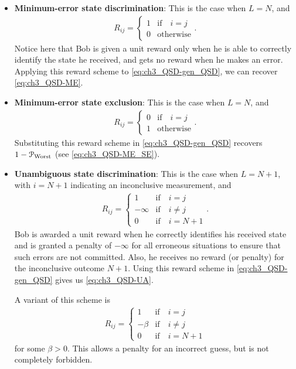 \begin{itemize} 
\item \textbf{Minimum-error state discrimination}: This is the case when $L = N$, and
\begin{align}
    \label{eq:ch3_QSD-R_ME_SD}
    R_{ij} =
    \begin{cases}
        1 &\text{if} \quad i = j \\
        0 &\text{otherwise}
    \end{cases}.
\end{align}
Notice here that Bob is given a unit reward only when he is able to correctly identify the state he received, and gets no reward when he makes an error.
Applying this reward scheme to \eqref{eq:ch3_QSD-gen_QSD}, we can recover \eqref{eq:ch3_QSD-ME}. 

\item \textbf{Minimum-error state exclusion}: 
This is the case when $L = N$, and
\begin{align}
    \label{eq:ch3_QSD-R_ME_SE}
    R_{ij} =
    \begin{cases}
        0 &\text{if} \quad i = j \\
        1 &\text{otherwise}
    \end{cases}. 
\end{align}
Substituting this reward scheme in \eqref{eq:ch3_QSD-gen_QSD} recovers $1 - \mathcal{P}_{\mathrm{Worst}}$ (see \eqref{eq:ch3_QSD-ME_SE}). 

\item \textbf{Unambiguous state discrimination}: 
This is the case when $L = N+1$, with $i = N+1$ indicating an inconclusive measurement, and
\begin{align}
    \label{eq:ch3_QSD-R_UA_SD}
    R_{ij} =
    \begin{cases}
        1 &\text{if} \quad i = j \\
        -\infty &\text{if} \quad i \ne j \\
        0 & \text{if} \quad i = N+1 
    \end{cases}. 
\end{align} 
Bob is awarded a unit reward when he correctly identifies his received state and is granted a penalty of $-\infty$ for all erroneous situations to ensure that such errors are not committed. 
Also, he receives no reward (or penalty) for the inconclusive outcome $N+1$.  
Using this reward scheme in \eqref{eq:ch3_QSD-gen_QSD} gives us \eqref{eq:ch3_QSD-UA}. 

A variant of this scheme is 
\begin{align}
    \label{eq:ch3_QSD-R_UA_SD}
    R_{ij} =
    \begin{cases} 
        1 &\text{if} \quad i = j \\
        -\beta &\text{if} \quad i \ne j \\
        0 & \text{if} \quad i = N+1 
    \end{cases} 
\end{align} 
for some $\beta > 0$. 
This allows a penalty for an incorrect guess, but is not completely forbidden. 


\end{itemize}

